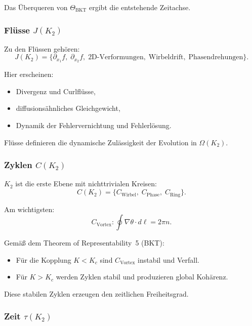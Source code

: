 Das Überqueren von $\Theta_{\mathrm{BKT}}$ ergibt die entstehende Zeitachse.

\subsubsection{Flüsse \texorpdfstring{$J(K_2)$}{J(K_2)}}

Zu den Flüssen gehören:
\[
J(K_2) = \{\partial_{x_1} f,\; \partial_{x_2} f,\;
\text{2D-Verformungen},\; \text{Wirbeldrift},\; \text{Phasendrehungen}\}.
\]

Hier erscheinen:
\begin{itemize}
    \item Divergenz und Curlflüsse,
    \item diffusionsähnliches Gleichgewicht,
    \item Dynamik der Fehlervernichtung und Fehlerlösung.
\end{itemize}

Flüsse definieren die dynamische Zulässigkeit der Evolution in $\Omega(K_2)$.

\subsubsection{Zyklen \texorpdfstring{$C(K_2)$}{C(K_2)}}

$K_2$ ist die erste Ebene mit nichttrivialen Kreisen:
\[
C(K_2) = \{C_{\mathrm{Wirbel}},\; C_{\mathrm{Phase}},\; C_{\mathrm{Ring}}\}.
\]

Am wichtigsten:
\[
C_{\mathrm{Vortex}}: \oint \nabla \theta \cdot d\ell = 2\pi n.
\]

Gemäß dem Theorem of Representability~5 (BKT):
\begin{itemize}
    \item Für die Kopplung $K < K_c$ sind $C_{\mathrm{Vortex}}$ instabil und
          Verfall.
    \item Für $K > K_c$ werden Zyklen stabil und produzieren global
          Kohärenz.
\end{itemize}

Diese stabilen Zyklen erzeugen den zeitlichen Freiheitsgrad.

\subsubsection{Zeit \texorpdfstring{$\tau(K_2)$}{\tau(K_2)}}

